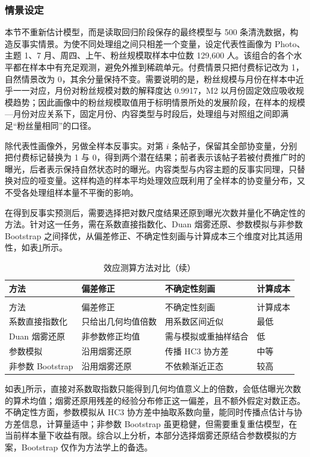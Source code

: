 \subsubsection{情景设定}

本节不重新估计模型，而是读取回归阶段保存的最终模型与 500 条清洗数据，构造反事实情景。为使不同处理组之间只相差一个变量，设定代表性画像为 Photo、主题 1、7 月、周四、上午、粉丝规模取样本中位数 129,600 人。该组合的各个水平都在样本中有充足观测，避免外推到稀疏单元。付费情景只把付费标记改为 1，自然情景改为 0，其余分量保持不变。需要说明的是，粉丝规模与月份在样本中近乎一一对应，月份对粉丝规模对数的解释度达 0.9917，M2 以月份固定效应吸收规模趋势；因此画像中的粉丝规模取值用于标明情景所处的发展阶段，在样本的规模—月份对应关系下，固定月份、内容类型与时段后，处理组与对照组之间即满足“粉丝量相同”的口径。

除代表性画像外，另做全样本反事实。对第 $i$ 条帖子，保留其全部协变量，分别把付费标记替换为 1 与 0，得到两个潜在结果；前者表示该帖子若被付费推广时的曝光，后者表示保持自然状态时的曝光。内容类型与内容主题的反事实同理，只替换对应的哑变量。这样构造的样本平均处理效应既利用了全样本的协变量分布，又不受各处理组样本量不平衡的影响。

在得到反事实预测后，需要选择把对数尺度结果还原到曝光次数并量化不确定性的方法。针对这一任务，需在系数直接指数化、Duan 烟雾还原、参数模拟与非参数 Bootstrap 之间择优，从偏差修正、不确定性刻画与计算成本三个维度对比其适用性，如表\ref{tab:algo4}所示。

\begin{longtable}{>{\centering\arraybackslash}p{}>{\centering\arraybackslash}p{}>{\centering\arraybackslash}p{}>{\centering\arraybackslash}p{}}
  \caption{效应测算方法对比}
  \label{tab:algo4} \\
  \toprule
  方法 & 偏差修正 & 不确定性刻画 & 计算成本 \\
  \midrule
  \endfirsthead
  \caption{效应测算方法对比（续）} \\
  \toprule
  方法 & 偏差修正 & 不确定性刻画 & 计算成本 \\
  \midrule
  \endhead
  \bottomrule
  \endfoot
  系数直接指数化 & 只给出几何均值倍数 & 用系数区间近似 & 最低 \\
  Duan 烟雾还原 & 非参数修正均值 & 需与模拟或重抽样结合 & 低 \\
  参数模拟 & 沿用烟雾还原 & 传播 HC3 协方差 & 中等 \\
  非参数 Bootstrap & 沿用烟雾还原 & 不依赖渐近正态 & 较高 \\
\end{longtable}

如表\ref{tab:algo4}所示，直接对系数取指数只能得到几何均值意义上的倍数，会低估曝光次数的算术均值；烟雾还原用残差的经验分布修正这一偏差，且不额外假定对数正态\cite{duan1983}。不确定性方面，参数模拟从 HC3 协方差中抽取系数向量，能同时传播点估计与协方差信息，计算量适中；非参数 Bootstrap 虽更稳健，但需要重复重估模型，在当前样本量下收益有限。综合以上分析，本部分选择烟雾还原结合参数模拟的方案，Bootstrap 仅作为方法学上的备选。
